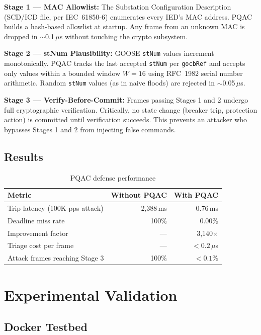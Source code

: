 \documentclass[11pt,a4paper]{article}
\begin{document}
\textbf{Stage 1 --- MAC Allowlist:} The Substation Configuration Description (SCD/ICD file, per IEC~61850-6) enumerates every IED's MAC address. PQAC builds a hash-based allowlist at startup. Any frame from an unknown MAC is dropped in $\sim$0.1\,$\mu$s without touching the crypto subsystem.

\textbf{Stage 2 --- stNum Plausibility:} GOOSE \texttt{stNum} values increment monotonically. PQAC tracks the last accepted \texttt{stNum} per \texttt{gocbRef} and accepts only values within a bounded window $W = 16$ using RFC~1982 serial number arithmetic. Random \texttt{stNum} values (as in naive floods) are rejected in $\sim$0.05\,$\mu$s.

\textbf{Stage 3 --- Verify-Before-Commit:} Frames passing Stages 1 and 2 undergo full cryptographic verification. Critically, no state change (breaker trip, protection action) is committed until verification succeeds. This prevents an attacker who bypasses Stages 1 and 2 from injecting false commands.

\subsection{Results}

\begin{table}[H]
\centering
\caption{PQAC defense performance}
\begin{tabular}{@{}lrr@{}}
\toprule
\textbf{Metric} & \textbf{Without PQAC} & \textbf{With PQAC} \\
\midrule
Trip latency (100K pps attack) & 2{,}388\,ms & 0.76\,ms \\
Deadline miss rate & 100\% & 0.00\% \\
Improvement factor & --- & 3{,}140$\times$ \\
Triage cost per frame & --- & $< 0.2\,\mu$s \\
Attack frames reaching Stage 3 & 100\% & $< 0.1\%$ \\
\bottomrule
\end{tabular}
\end{table}

\section{Experimental Validation}
\label{sec:experiments}

\subsection{Docker Testbed}
\end{document}
